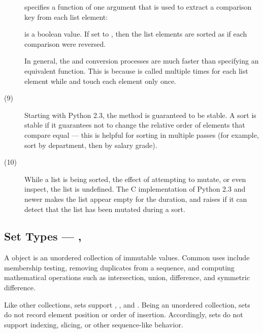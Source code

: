 \begin{description}
   specifies a function of one argument that is used to
     extract a comparison key from each list element:

   is a boolean value.  If set to , then the
     list elements are sorted as if each comparison were reversed.

  In general, the  and  conversion processes are
  much faster than specifying an equivalent  function.  This is
  because  is called multiple times for each list element while
   and  touch each element only once.



\item[(9)] Starting with Python 2.3, the  method is
  guaranteed to be stable.  A sort is stable if it guarantees not to
  change the relative order of elements that compare equal --- this is
  helpful for sorting in multiple passes (for example, sort by
  department, then by salary grade).

\item[(10)] While a list is being sorted, the effect of attempting to
  mutate, or even inspect, the list is undefined.  The C
  implementation of Python 2.3 and newer makes the list appear empty
  for the duration, and raises  if it can detect
  that the list has been mutated during a sort.
\end{description}

\subsection{Set Types ---
	    , 
	    \label{types-set}}

A  object is an unordered collection of immutable values.
Common uses include membership testing, removing duplicates from a sequence,
and computing mathematical operations such as intersection, union, difference,
and symmetric difference.

Like other collections, sets support ,
, and .  Being an
unordered collection, sets do not record element position or order of
insertion.  Accordingly, sets do not support indexing, slicing, or
other sequence-like behavior.     

